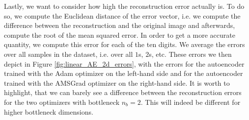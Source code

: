 Lastly, we want to consider how high the reconstruction error actually is. To do so, we compute the Euclidean distance of the error vector, i.e. we compute the difference between the reconstruction and the original image and afterwards, compute the root of the mean squared error. In order to get a more accurate quantity, we compute this error for each of the ten digits. We average the errors over all samples in the dataset, i.e. over all $1$s, $2$s, etc. These errors we then depict in Figure \ref{fig:linear_AE_2d_errors}, with the errors for the autoencoder trained with the Adam optimizer on the left-hand side and for the autoencoder trained with the AMSGrad optimizer on the right-hand side. It is worth to highlight, that we can barely see a difference between the reconstruction errors for the two optimizers with bottleneck $n_b=2$. This will indeed be different for higher bottleneck dimensions.


